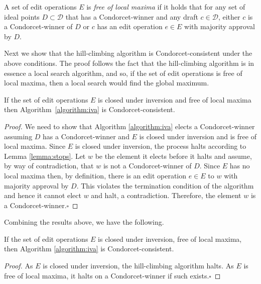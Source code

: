 \documentclass{llncs}
\newcommand{\qqed}{\hfill$\square$}
\newcommand{\calD}{\mathcal{D}}
\begin{document}
\begin{definition}
%
A set of edit operations $E$ is \emph{free of local maxima} if it holds that for any set of ideal points $D \subset \calD$ that has a Condorcet-winner and any draft $c \in \calD$, either $c$ is a Condorcet-winner of $D$ or $c$ has an edit operation $e \in E$ with majority approval by $D$.
%
\end{definition}

Next we show that the hill-climbing algorithm is Condorcet-consistent under the above conditions. The proof follows the fact that the hill-climbing algorithm is in essence a local search algorithm, and so, if the set of edit operations is free of local maxima, then a local search would find the global maximum.

\begin{lemma}\label{lemma:IIAV-epsilon-condorcet}
If the set of edit operations $E$ is closed under inversion and free of local maxima then Algorithm~\ref{algorithm:iva} is Condorcet-consistent.
\end{lemma}

\begin{proof}
%
We need to show that Algorithm \ref{algorithm:iva} elects a Condorcet-winner assuming $D$ has a Condorcet-winner and $E$ is closed under inversion and is free of local maxima.
Since $E$ is closed under inversion, the process halts according to Lemma \ref{lemma:stops}.  Let $w$ be the element it elects before it halts and assume, by way of contradiction, that $w$ is not a Condorcet-winner of $D$.  Since $E$ has no local maxima then, by definition, there is an edit operation $e \in E$ to $w$ with majority approval by $D$.  This violates the termination condition of the algorithm and hence it cannot elect $w$ and halt, a contradiction.   Therefore, the element $w$ is a Condorcet-winner.\qqed
%
\end{proof}

Combining the results above, we have the following.

\begin{corollary}\label{corollary:IIAV--condorcet}
If the set of edit operations $E$ is closed under inversion, free of local maxima, then Algorithm \ref{algorithm:iva} is Condorcet-consistent.
\end{corollary}

\begin{proof}
%
As $E$ is closed under inversion, the hill-climbing algorithm halts. As $E$ is free of local maxima, it halts on a Condorcet-winner if such exists.\qqed
%
\end{proof}
\end{document}
